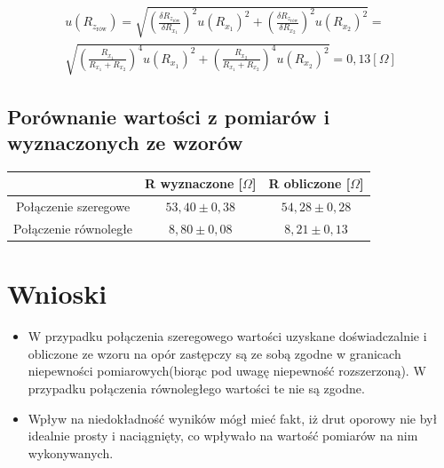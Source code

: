 \documentclass [a4paper,11pt]{article}
\begin{document}
\begin{multline}
u(R_{z_\text{rów}}) = \sqrt{\left( \frac{\delta R_{z_\text{rów}} }{\delta R_{x_1}}  \right)^2 u(R_{x_1})^2  +\left( \frac{\delta R_{z_\text{rów}} }{\delta R_{x_2}}  \right)^2  u(R_{x_2})^2  }  = \\ \sqrt{\left(  \frac{R_{x_1}}{R_{x_1} + R_{x_2}}\right)^4  u(R_{x_1})^2 + \left(\frac{R_{x_2}}{R_{x_1} + R_{x_2}}\right)^4  u(R_{x_2})^2   } =  0,13 [\Omega]
\label{eq:R_x12row_zast_delta} 
\end{multline}

\subsection{Porównanie wartości z pomiarów i wyznaczonych ze wzorów}
\begin{tabular}{|c|c|c|}
\hline 						 & R wyznaczone [$\Omega$]  & R obliczone [$\Omega$] \\ 
\hline Połączenie szeregowe & $53,40 \pm 0,38$ & $54,28 \pm 0,28$ \\ 
\hline Połączenie równoległe & $8,80 \pm 0,08$ & $8,21 \pm 0,13$ \\ 
\hline 
\end{tabular} 
\section{Wnioski}
\begin{itemize}
\item W przypadku połączenia szeregowego wartości uzyskane doświadczalnie i obliczone ze wzoru na opór zastępczy są ze sobą zgodne w granicach niepewności pomiarowych(biorąc pod uwagę niepewność rozszerzoną). W przypadku połączenia równoległego wartości te nie są zgodne.
\item Wpływ na niedokładność wyników mógł mieć fakt, iż drut oporowy nie był idealnie prosty i naciągnięty, co wpływało na wartość pomiarów na nim wykonywanych.
 
\end{itemize}
\end{document}
